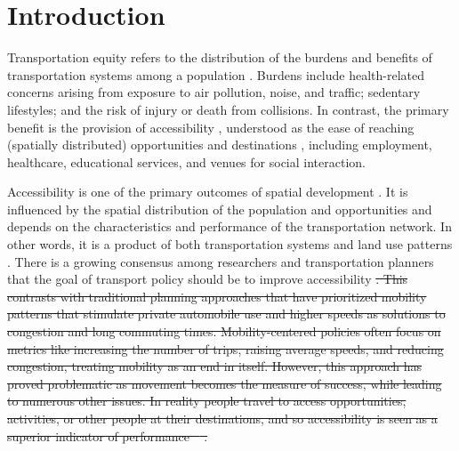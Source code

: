 \documentclass[preprint, 3p,
authoryear]{elsarticle} %
\providecommand{\DIFdeltex}[1]{{\protect\color{red}\sout{#1}}}                      %
\providecommand{\DIFdelbegin}{} %
\providecommand{\DIFdel}[1]{\texorpdfstring{\DIFdeltex{#1}}{}} %
\newcommand{\DIFscaledelfig}{0.5}
\newlength{\DIFdelgraphicswidth} %
\newlength{\DIFdelgraphicsheight} %
\newcommand{\DIFdelincludegraphics}[2][]{%
\sbox{\DIFdelgraphicsbox}{\DIFOincludegraphics[#1]{#2}}%
\settoboxwidth{\DIFdelgraphicswidth}{\DIFdelgraphicsbox} %
\settoboxtotalheight{\DIFdelgraphicsheight}{\DIFdelgraphicsbox} %
\scalebox{\DIFscaledelfig}{%
\parbox[b]{\DIFdelgraphicswidth}{\usebox{\DIFdelgraphicsbox}\\[-\baselineskip] \rule{\DIFdelgraphicswidth}{0em}}\llap{\resizebox{\DIFdelgraphicswidth}{\DIFdelgraphicsheight}{%
\setlength{\unitlength}{\DIFdelgraphicswidth}%
\begin{picture}(1,1)%
\thicklines\linethickness{2pt} %
{\color[rgb]{1,0,0}\put(0,0){\framebox(1,1){}}}%
{\color[rgb]{1,0,0}\put(0,0){\line( 1,1){1}}}%
{\color[rgb]{1,0,0}\put(0,1){\line(1,-1){1}}}%
\end{picture}%
}\hspace*{3pt}}} %
} %
\DeclareRobustCommand{\DIFdelbegin}{\DIFOdelbegin \let\includegraphics\DIFdelincludegraphics} %
\begin{document}
\section{Introduction}\label{introduction}

Transportation equity refers to the distribution of the burdens and
benefits of transportation systems among a population
\citep{karner2020, pereira2017}. Burdens include health-related concerns
arising from exposure to air pollution, noise, and traffic; sedentary
lifestyles; and the risk of injury or death from collisions. In
contrast, the primary benefit is the provision of accessibility
\citep{pereira2021}, understood as the ease of reaching (spatially
distributed) opportunities and destinations
\citep{páez2012, hansen1959, soukhov2025}, including employment,
healthcare, educational services, and venues for social interaction.

Accessibility is one of the primary outcomes of spatial development
\citep{páez2012}. It is influenced by the spatial distribution of the
population and opportunities and depends on the characteristics and
performance of the transportation network. In other words, it is a
product of both transportation systems and land use patterns
\citep{wee2011}. There is a growing consensus among researchers and
transportation planners that the goal of transport policy should be to
improve accessibility \citep{el-geneidy2022, boisjoly2017}\DIFdelbegin \DIFdel{. This
contrasts with traditional planning approaches that have prioritized
mobility patterns that stimulate private automobile use and higher
speeds as solutions to congestion and long commuting times.
Mobility-centered policies often focus on metrics like increasing the
number of trips, raising average speeds, and reducing congestion,
treating mobility as an end in itself. However, this approach has proved
problematic as movement becomes the measure of success, while leading to numerous other issues. In
reality people travel to access opportunities,
activities, or other people at their destinations, and so accessibility
is seen as a superior indicator of performance \mbox{%
\citep{pereira2023}}\hskip0pt%
.
}%
\end{document}
